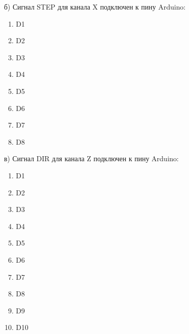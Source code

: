 б) Сигнал STEP для канала X подключен к пину Arduino: 

\begin{enumerate}
    \item D1
    \item D2
    \item D3
    \item D4
    \item D5
    \item D6
    \item D7
    \item D8
\end{enumerate}

в) Сигнал DIR для канала Z подключен к пину Arduino: 

\begin{enumerate}
    \item D1
    \item D2
    \item D3
    \item D4
    \item D5
    \item D6
    \item D7
    \item D8
    \item D9
    \item D10
\end{enumerate}